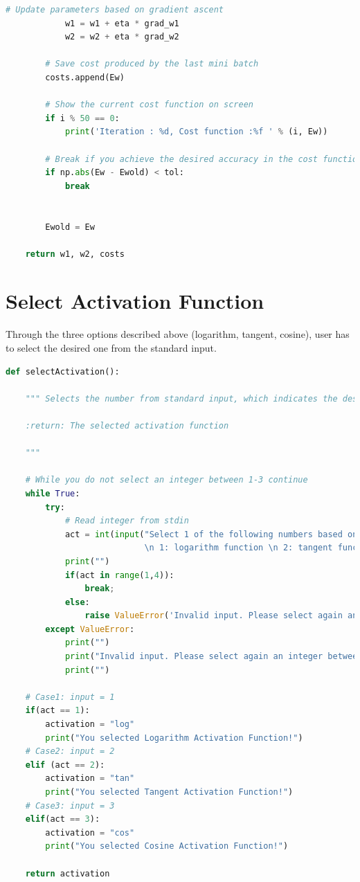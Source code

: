 \documentclass[11pt]{article}
\begin{document}
\begin{lstlisting}[language = Python]
            # Update parameters based on gradient ascent
            w1 = w1 + eta * grad_w1
            w2 = w2 + eta * grad_w2
            
        # Save cost produced by the last mini batch
        costs.append(Ew)
        
        # Show the current cost function on screen
        if i % 50 == 0:
            print('Iteration : %d, Cost function :%f ' % (i, Ew))

        # Break if you achieve the desired accuracy in the cost function
        if np.abs(Ew - Ewold) < tol:
            break
                

        Ewold = Ew

    return w1, w2, costs
\end{lstlisting}

\newpage 
\section{Select Activation Function}

Through the three options described above (logarithm, tangent, cosine), user has to select the desired one from the standard input. \\

\begin{lstlisting}[language = Python]
def selectActivation(): 
    
    """ Selects the number from standard input, which indicates the desired activation function. 
    
    :return: The selected activation function
    
    """
    
    # While you do not select an integer between 1-3 continue
    while True:
        try:
            # Read integer from stdin
            act = int(input("Select 1 of the following numbers based on the desired Activation Function:\n \
                            \n 1: logarithm function \n 2: tangent function \n 3: cosine function\n"))
            print("")
            if(act in range(1,4)):
                break;
            else:
                raise ValueError('Invalid input. Please select again an integer between 1-3!')
        except ValueError:
            print("")
            print("Invalid input. Please select again an integer between 1-3!")
            print("")
            
    # Case1: input = 1
    if(act == 1):
        activation = "log"
        print("You selected Logarithm Activation Function!")
    # Case2: input = 2
    elif (act == 2):
        activation = "tan"
        print("You selected Tangent Activation Function!")
    # Case3: input = 3
    elif(act == 3):
        activation = "cos"
        print("You selected Cosine Activation Function!")
        
    return activation
\end{lstlisting}
\end{document}
